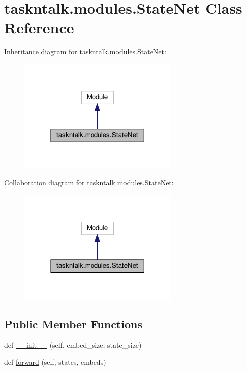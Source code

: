 \hypertarget{classtaskntalk_1_1modules_1_1StateNet}{}\section{taskntalk.\+modules.\+State\+Net Class Reference}
\label{classtaskntalk_1_1modules_1_1StateNet}


Inheritance diagram for taskntalk.\+modules.\+State\+Net\+:
\nopagebreak
\begin{figure}[H]
\begin{center}
\leavevmode
\includegraphics[width=218pt]{classtaskntalk_1_1modules_1_1StateNet__inherit__graph}
\end{center}
\end{figure}


Collaboration diagram for taskntalk.\+modules.\+State\+Net\+:
\nopagebreak
\begin{figure}[H]
\begin{center}
\leavevmode
\includegraphics[width=218pt]{classtaskntalk_1_1modules_1_1StateNet__coll__graph}
\end{center}
\end{figure}
\subsection*{Public Member Functions}
\begin{DoxyCompactItemize}
\item 
def \hyperlink{classtaskntalk_1_1modules_1_1StateNet_a632af0c7095036fbf34848bb8f930f3a}{\+\_\+\+\_\+init\+\_\+\+\_\+} (self, embed\+\_\+size, state\+\_\+size)
\item 
def \hyperlink{classtaskntalk_1_1modules_1_1StateNet_a174496bd7384bf033ccc667174f3be4c}{forward} (self, states, embeds)
\end{DoxyCompactItemize}
